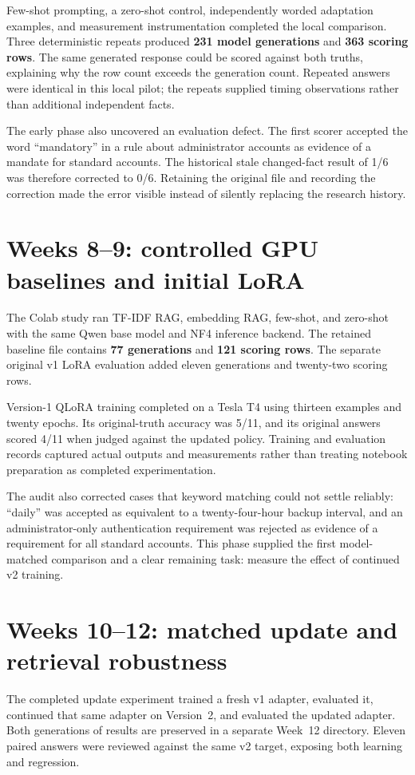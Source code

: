 \documentclass[11pt,letterpaper,oneside]{report}
\begin{document}
Few-shot prompting, a zero-shot control, independently worded adaptation examples, and measurement instrumentation completed the local comparison. Three deterministic repeats produced \textbf{231 model generations} and \textbf{363 scoring rows}. The same generated response could be scored against both truths, explaining why the row count exceeds the generation count. Repeated answers were identical in this local pilot; the repeats supplied timing observations rather than additional independent facts.

The early phase also uncovered an evaluation defect. The first scorer accepted the word ``mandatory'' in a rule about administrator accounts as evidence of a mandate for standard accounts. The historical stale changed-fact result of 1/6 was therefore corrected to 0/6. Retaining the original file and recording the correction made the error visible instead of silently replacing the research history.

\section{Weeks 8--9: controlled GPU baselines and initial LoRA}
The Colab study ran TF-IDF RAG, embedding RAG, few-shot, and zero-shot with the same Qwen base model and NF4 inference backend. The retained baseline file contains \textbf{77 generations} and \textbf{121 scoring rows}. The separate original v1 LoRA evaluation added eleven generations and twenty-two scoring rows.

Version-1 QLoRA training completed on a Tesla T4 using thirteen examples and twenty epochs. Its original-truth accuracy was 5/11, and its original answers scored 4/11 when judged against the updated policy. Training and evaluation records captured actual outputs and measurements rather than treating notebook preparation as completed experimentation.

The audit also corrected cases that keyword matching could not settle reliably: ``daily'' was accepted as equivalent to a twenty-four-hour backup interval, and an administrator-only authentication requirement was rejected as evidence of a requirement for all standard accounts. This phase supplied the first model-matched comparison and a clear remaining task: measure the effect of continued v2 training.

\section{Weeks 10--12: matched update and retrieval robustness}
The completed update experiment trained a fresh v1 adapter, evaluated it, continued that same adapter on Version~2, and evaluated the updated adapter. Both generations of results are preserved in a separate Week~12 directory. Eleven paired answers were reviewed against the same v2 target, exposing both learning and regression.
\end{document}
